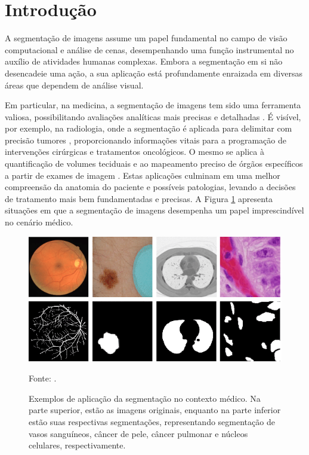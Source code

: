\newpage
{}
\setcounter{page}{17}

\section{Introdução}
\label{intro}

A segmentação de imagens assume um papel fundamental no campo de visão computacional e análise de cenas, desempenhando uma função instrumental no auxílio de atividades humanas complexas. Embora a segmentação em si não desencadeie uma ação, a sua aplicação está profundamente enraizada em diversas áreas que dependem de análise visual.

Em particular, na medicina, a segmentação de imagens tem sido uma ferramenta valiosa, possibilitando avaliações analíticas mais precisas e detalhadas \citep{Lai2015, Withey2008}. É visível, por exemplo, na radiologia, onde a segmentação é aplicada para delimitar com precisão tumores \citep{Malkanthi2017}, proporcionando informações vitais para a programação de intervenções cirúrgicas e tratamentos oncológicos. O mesmo se aplica à quantificação de volumes teciduais e ao mapeamento preciso de órgãos específicos a partir de exames de imagem \citep{Gibson2018, Schoppe2020}. Estas aplicações culminam em uma melhor compreensão da anatomia do paciente e possíveis patologias, levando a decisões de tratamento mais bem fundamentadas e precisas. A Figura \ref{intro:fig:1} apresenta situações em que a segmentação de imagens desempenha um papel imprescindível no cenário médico.

\begin{figure}[H]
    \centering
    \caption{Exemplos de aplicação da segmentação no contexto médico. Na parte superior, estão as imagens originais, enquanto na parte inferior estão suas respectivas segmentações, representando segmentação de vasos sanguíneos, câncer de pele, câncer pulmonar e núcleos celulares, respectivamente.}
    \includegraphics[width=1\linewidth]{recursos/imagens/introduction/medical-image-segmentation.png}
    \label{intro:fig:1}

    Fonte: \cite{Asadi-Aghbolaghi2020}.
\end{figure}

